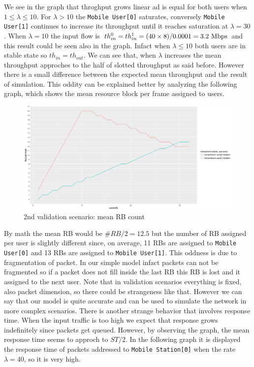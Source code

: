 We see in the graph that throghput grows linear ad is equal for both users when \(1 \leq \lambda \leq 10 \). For \(\lambda > 10 \) the \texttt{Mobile User[0]} saturates, conversely \texttt{Mobile User[1]} continues to increase its throughput until it reaches saturation at \(\lambda = 30\).
When \(\lambda = 10 \) the input flow is \(th_{in}^{0} = th_{in}^{1} = (40 \times 8)/0.0001 = 3.2\textnormal{ Mbps}\) and this result could be seen also in the graph. Infact when \(\lambda \le 10 \) both users are in stable state so \(th_{in} = th_{out}\). We can see that, when \(\lambda\) increases the mean throughput approches to the half of slotted throughput as said before. However there is a small difference between the expected mean throughput and the result of simulation. This oddity can be explained better by analyzing the following graph, which shows the mean resource block per frame assigned to users.
\begin{figure}[H]
  \includegraphics[width=1\textwidth]{images/RBCompvalidation2}
  \caption{2nd validation scenario: mean RB count}
  \label{fig:2nd validation scenario: mean RB count}
\end{figure}
By math the mean RB would be \(\#RB / 2 = 12.5 \) but the number of RB assigned per user is slightly different since, on average, 11 RBs are assigned to \texttt{Mobile User[0]} and 13 RBs are assigned to \texttt{Mobile User[1]}. This oddness is due to fragmentation of packet. In our simple model infact packets can not be fragmented so if a packet does not fill inside the last RB this RB is lost and it assigned to the next user. Note that in validation scenarios everything is fixed, also packet dimension, so there could be strangeness like that. However we can say that our model is quite accurate and can be used to simulate the network in more complex scenarios. 
There is another strange behavior that involves response time. When the input traffic is too high we expect that response grows indefinitely since packets get queued. However, by observing the graph, the mean response time seems to approch to \(ST/2\). In the following graph it is displayed the response time of packets addressed to \texttt{Mobile Station[0]} when the rate \(\lambda = 40\), so it is very high.
